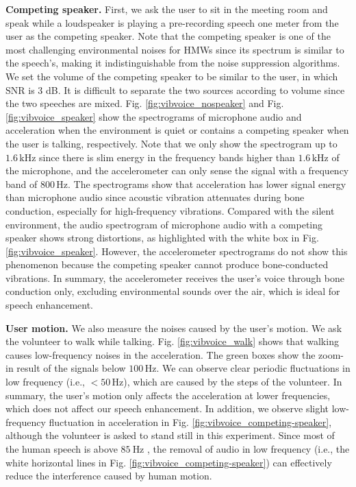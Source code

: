 \noindent\textbf{Competing speaker.}
First, we ask the user to sit in the meeting room and speak while a loudspeaker is playing a pre-recording speech one meter from the user as the competing speaker. Note that the competing speaker is one of the most challenging environmental noises for HMWs since its spectrum is similar to the speech's, making it indistinguishable from the noise suppression algorithms. 
We set the volume of the competing speaker to be similar to the user, in which SNR is 3 dB. It is difficult to separate the two sources according to volume since the two speeches are mixed.
Fig. \ref{fig:vibvoice_nospeaker} and Fig. \ref{fig:vibvoice_speaker} show the spectrograms of microphone audio and acceleration when the environment is quiet or contains a competing speaker when the user is talking, respectively.
Note that we only show the spectrogram up to $1.6\,\text{kHz}$ since there is slim energy in the frequency bands higher than $1.6\,\text{kHz}$ of the microphone, and the accelerometer can only sense the signal with a frequency band of $800\,\text{Hz}$.
The spectrograms show that acceleration has lower signal energy than microphone audio since acoustic vibration attenuates during bone conduction, especially for high-frequency vibrations. Compared with the silent environment, the audio spectrogram of microphone audio with a competing speaker shows strong distortions, as highlighted with the white box in Fig. \ref{fig:vibvoice_speaker}. However, the accelerometer spectrograms do not show this phenomenon because the competing speaker cannot produce bone-conducted vibrations.
In summary, the accelerometer receives the user's voice through bone conduction only, excluding environmental sounds over the air, which is ideal for speech enhancement.

\noindent\textbf{User motion.}
We also measure the noises caused by the user's motion. We ask the volunteer to walk while talking. Fig. \ref{fig:vibvoice_walk} shows that walking causes low-frequency noises in the acceleration. The green boxes show the zoom-in result of the signals below $100\,\text{Hz}$. We can observe clear periodic fluctuations in low frequency (i.e., $< 50\,\text{Hz}$), which are caused by the steps of the volunteer.
In summary, the user's motion only affects the acceleration at lower frequencies, which does not affect our speech enhancement.
In addition, we observe slight low-frequency fluctuation in acceleration in Fig. \ref{fig:vibvoice_competing-speaker}, although the volunteer is asked to stand still in this experiment. Since most of the human speech is above $85~\text{Hz}$ \citep{Voicefre75:online}, the removal of audio in low frequency (i.e., the white horizontal lines in Fig. \ref{fig:vibvoice_competing-speaker}) can effectively reduce the interference caused by human motion.

